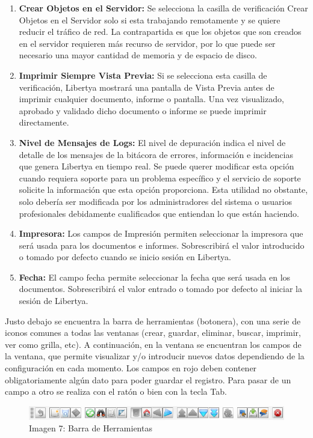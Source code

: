 \documentclass[letterpaper,10pt,spanish]{sphinxmanual}
\begin{document}
\begin{enumerate}
\item {} 
\textbf{Crear Objetos en el Servidor:} Se selecciona la casilla de verificación Crear Objetos en el Servidor solo si esta trabajando remotamente y se quiere reducir el tráfico de red. La contrapartida es que los objetos que son creados en el servidor requieren más recurso de servidor, por lo que puede ser necesario una mayor cantidad de memoria y de espacio de disco.

\item {} 
\textbf{Imprimir Siempre Vista Previa:} Si se selecciona esta casilla de verificación, Libertya mostrará una pantalla de Vista Previa antes de imprimir cualquier documento, informe o pantalla. Una vez visualizado, aprobado y validado dicho documento o informe se puede imprimir directamente.

\item {} 
\textbf{Nivel de Mensajes de Logs:} El nivel de depuración indica el nivel de detalle de los mensajes de la bitácora de errores, información e incidencias que genera Libertya en tiempo real. Se puede querer modificar esta opción cuando requiera soporte para un problema específico y el servicio de soporte solicite la información que esta opción proporciona. Esta utilidad no obstante, solo debería ser modificada por los administradores del sistema o usuarios profesionales debidamente cualificados que entiendan lo que están haciendo.

\item {} 
\textbf{Impresora:} Los campos de Impresión permiten seleccionar la impresora que será usada para los documentos e informes. Sobrescribirá el valor introducido o tomado por defecto cuando se inicio sesión en Libertya.

\item {} 
\textbf{Fecha:} El campo fecha permite seleccionar la fecha que será usada en los documentos. Sobrescribirá el valor entrado o tomado por defecto al iniciar la sesión de Libertya.

\end{enumerate}

Justo debajo se encuentra la barra de herramientas (botonera), con una serie de iconos comunes a todas las ventanas (crear, guardar, eliminar, buscar, imprimir, ver como grilla, etc). A continuación, en la ventana se encuentran los campos de la ventana, que permite visualizar y/o introducir nuevos datos dependiendo de la configuración en cada momento. Los campos en rojo deben contener obligatoriamente algún dato para poder guardar el registro. Para pasar de un campo a otro se realiza con el ratón o bien con la tecla Tab.
\begin{figure}[htbp]
\centering
\capstart

\includegraphics{ly_barra.png}
\caption{Imagen 7: Barra de Herramientas}\end{figure}
\end{document}
